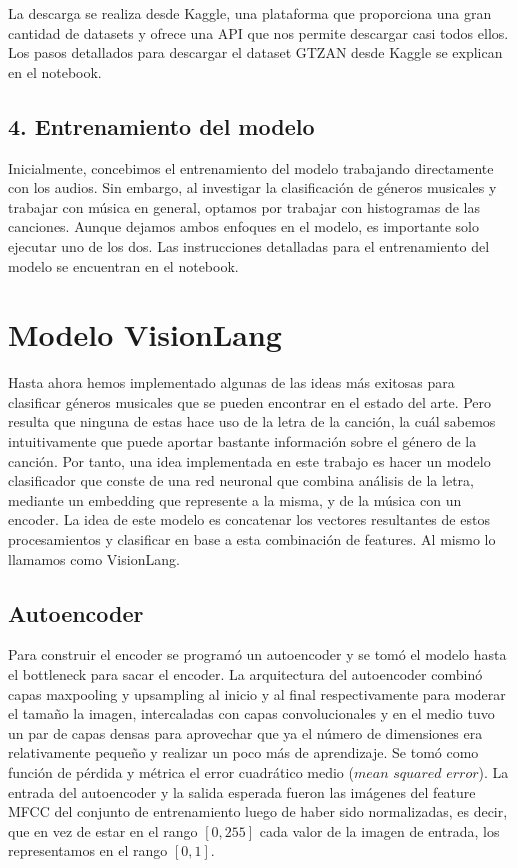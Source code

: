\documentclass[colorinlistoftodos,twoside,twocolumn,10pt]{article} %
\begin{document}
La descarga se realiza desde Kaggle, una plataforma que proporciona una gran cantidad de datasets y ofrece una API que nos permite descargar casi todos ellos. Los pasos detallados para descargar el dataset GTZAN desde Kaggle se explican en el notebook.

\subsection*{4. Entrenamiento del modelo}

Inicialmente, concebimos el entrenamiento del modelo trabajando directamente con los audios. Sin embargo, al investigar la clasificación de géneros musicales y trabajar con música en general, optamos por trabajar con histogramas de las canciones. Aunque dejamos ambos enfoques en el modelo, es importante solo ejecutar uno de los dos. Las instrucciones detalladas para el entrenamiento del modelo se encuentran en el notebook.

\section{Modelo VisionLang}

Hasta ahora hemos implementado algunas de las ideas m\'as exitosas para clasificar g\'eneros musicales que se pueden encontrar en el estado del arte. Pero resulta que ninguna de estas hace uso de la letra de la canci\'on, la cu\'al sabemos intuitivamente que puede aportar bastante informaci\'on sobre el g\'enero de la canci\'on. Por tanto, una idea implementada en este trabajo es hacer un modelo clasificador que conste de una red neuronal que combina análisis de la letra, mediante un embedding que represente a la misma, y de la música con un encoder. La idea de este modelo es concatenar los vectores resultantes de estos procesamientos y clasificar en base a esta combinación de features. Al mismo lo llamamos como VisionLang.

\subsection{Autoencoder}
Para construir el encoder se programó un autoencoder y se tomó el modelo hasta el bottleneck para sacar el encoder. La arquitectura del autoencoder combinó capas maxpooling y upsampling al inicio y al final respectivamente para moderar el tamaño la imagen, intercaladas con capas convolucionales y en el medio tuvo un par de capas densas para aprovechar que ya el número de dimensiones era relativamente pequeño y realizar un poco más de aprendizaje. Se tomó como función de pérdida y métrica el error cuadrático medio ($\textit{mean squared error}$). La entrada del autoencoder y la salida esperada fueron las imágenes del feature MFCC del conjunto de entrenamiento luego de haber sido normalizadas, es decir, que en vez de estar en el rango $[0, 255]$ cada valor de la imagen de entrada, los representamos en el rango $[0, 1]$. 
\end{document}
